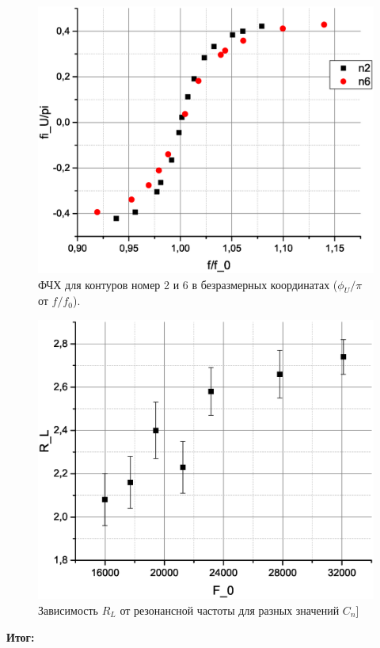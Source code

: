 \documentclass[a4paper,12pt]{article}
\begin{document}
\begin{figure}[ht]
\centering
\includegraphics[width=150mm]{graph14.eps}
\caption{ФЧХ для контуров номер 2 и 6 в безразмерных координатах ($\phi_U/\pi$ от $f/f_0$).}\label{fchh1}
\end{figure}

\begin{figure}[ht]
\centering
\includegraphics[width=150mm]{graph15.eps}
\caption{Зависимость $R_L$ от резонансной частоты для разных значений $C_n$]}\label{plotrl}
\end{figure}


\bigskip

\textbf{Итог:}
\bigskip
 
\end{document}
